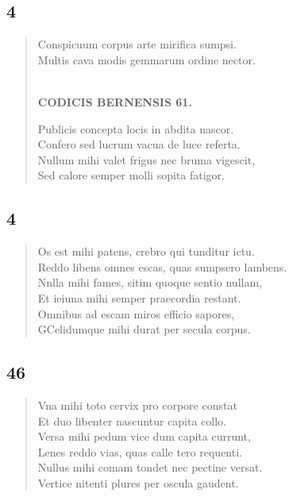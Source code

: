 \documentclass[11pt, a4paper]{report}
\begin{document}
            \subsection*{4}
      \begin{verse}
      Conspicuum corpus arte mirifica sumpsi. \\ Multis cava modis gemmarum ordine nector. \\ 
        ﻿\pagebreak 
    \begin{center} \textbf{CODICIS BERNENSIS 61.} \end{center} \marginpar{[365]} Publicis concepta locis in abdita nascor. \\ Confero sed lucrum vacua de luce referta. \\ Nullum mihi valet frigus nec bruma vigescit, \\ Sed calore semper molli sopita fatigor. \\ 
      \end{verse}
  
            \subsection*{4}
      \begin{verse}
      Os est mihi patens, crebro qui tunditur ictu. \\ Reddo libens omnes escas, quas sumpsero lambens. \\ Nnlla mihi fames, sitim quoque sentio nullam, \\ Et ieiuna mihi semper praecordia restant. \\ Omnibus ad escam miros efficio sapores, \\ GCelidumque mihi durat per secula corpus. \\ 
      \end{verse}
  
            \subsection*{46}
      \begin{verse}
      Vna mihi toto cervix pro corpore constat \\ Et duo libenter nascuntur capita collo. \\ Versa mihi pedum vice dum capita currunt, \\ Lenes reddo vias, quas calle tero requenti. \\ Nullus mihi comam tondet nec pectine versat. \\ Vertice nitenti plures per oscula gaudent. \\ 
      \end{verse}
  
\end{document}
